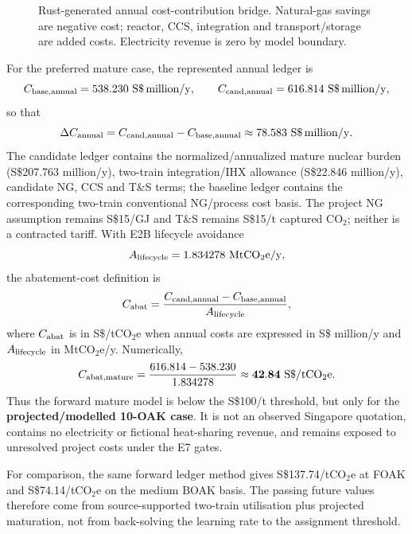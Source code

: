 \begin{figure}[htbp]\centering

\caption{Rust-generated annual cost-contribution bridge.  Natural-gas savings are negative cost; reactor, CCS, integration and transport/storage are added costs.  Electricity revenue is zero by model boundary.}
\label{fig:cost-bridge}
\end{figure}




For the preferred mature case, the represented annual ledger is
\[
C_{\rm base,annual}=538.230~\mathrm{S\$\,million/y},\qquad
C_{\rm cand,annual}=616.814~\mathrm{S\$\,million/y},
\]
so that
\[
\Delta C_{\rm annual}
=C_{\rm cand,annual}-C_{\rm base,annual}
\approx78.583~\mathrm{S\$\,million/y}.
\]
The candidate ledger contains the normalized/annualized mature nuclear burden (S\$207.763 million/y), two-train integration/IHX allowance (S\$22.846 million/y), candidate NG, CCS and T\&S terms; the baseline ledger contains the corresponding two-train conventional NG/process cost basis. The project NG assumption remains S\$15/GJ and T\&S remains S\$15/t captured CO$_2$; neither is a contracted tariff. With E2B lifecycle avoidance
\[
A_{\rm lifecycle}=1.834278~\mathrm{MtCO_2e/y},
\]
the abatement-cost definition is
\begin{equation}
C_{\rm abat}
=\frac{C_{\rm cand,annual}-C_{\rm base,annual}}{A_{\rm lifecycle}},
\end{equation}
where $C_{\rm abat}$ is in S\$/tCO$_2$e when annual costs are expressed in S\$ million/y and $A_{\rm lifecycle}$ in MtCO$_2$e/y. Numerically,
\[
C_{\rm abat,mature}
=\frac{616.814-538.230}{1.834278}
\approx\mathbf{42.84~\mathrm{S\$/tCO_2e}}.
\]
Thus the forward mature model is below the S\$100/t threshold, but only for the \textbf{projected/modelled 10-OAK case}. It is not an observed Singapore quotation, contains no electricity or fictional heat-sharing revenue, and remains exposed to unresolved project costs under the E7 gates.

For comparison, the same forward ledger method gives S\$137.74/tCO$_2$e at FOAK and S\$74.14/tCO$_2$e on the medium BOAK basis. The passing future values therefore come from source-supported two-train utilisation plus projected maturation, not from back-solving the learning rate to the assignment threshold.

